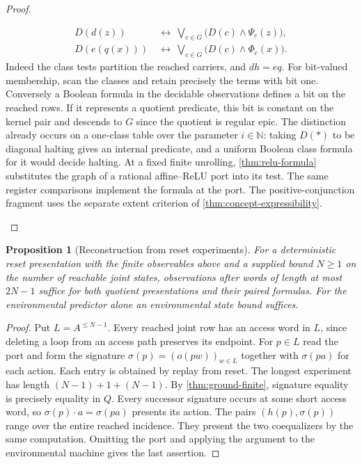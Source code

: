 \documentclass[11pt,a4paper]{article}
\newtheorem{proposition}[proposition]{Proposition}
\theoremstyle{definition}
\theoremstyle{remark}\newaliascnt{remark}{theorem}
\newcommand{\N}{\mathbb N}
\numberwithin{equation}{section}
\begin{document}
\begin{proof}
\begin{enumerate}[titledsteps]
\[\begin{aligned}
 D(d(z))&\ \longleftrightarrow\ \bigvee_{c\in G}\bigl(D(c)\wedge\Psi_c(z)\bigr),\\
 D(e(q(x)))&\ \longleftrightarrow\ \bigvee_{c\in G}\bigl(D(c)\wedge\Phi_c(x)\bigr).
 \end{aligned}
\]
Indeed the class tests partition the reached carriers, and $dh=eq$. For bit-valued membership, scan the classes and retain precisely the terms with bit one. Conversely a Boolean formula in the decidable observations defines a bit on the reached rows. If it represents a quotient predicate, this bit is constant on the kernel pair and descends to $G$ since the quotient is regular epic. The distinction already occurs on a one-class table over the parameter $i\in\N$: taking $D(*)$ to be diagonal halting gives an internal predicate, and a uniform Boolean class formula for it would decide halting. At a fixed finite unrolling, \cref{thm:relu-formula} substitutes the graph of a rational affine--ReLU port into its test. The same register comparisons implement the formula at the port. The positive-conjunction fragment uses the separate extent criterion of \cref{thm:concept-expressibility}.
\end{enumerate}
\end{proof}

\begin{proposition}[Reconstruction from reset experiments]\label{thm:ground-reset}
For a deterministic reset presentation with the finite observables above and a supplied bound $N\ge1$ on the number of reachable joint states, observations after words of length at most $2N-1$ suffice for both quotient presentations and their paired formulas. For the environmental predictor alone an environmental state bound suffices.
\end{proposition}
\begin{proof}
Put $L=A^{\le N-1}$. Every reached joint row has an access word in $L$, since deleting a loop from an access path preserves its endpoint. For $p\in L$ read the port and form the signature $\sigma(p)=(o(pw))_{w\in L}$ together with $\sigma(pa)$ for each action. Each entry is obtained by replay from reset. The longest experiment has length $(N-1)+1+(N-1)$. By \cref{thm:ground-finite}, signature equality is precisely equality in $Q$. Every successor signature occurs at some short access word, so $\sigma(p)\cdot a=\sigma(pa)$ presents its action. The pairs $(h(p),\sigma(p))$ range over the entire reached incidence. They present the two coequalizers by the same computation. Omitting the port and applying the argument to the environmental machine gives the last assertion.
\end{proof}
\end{document}
